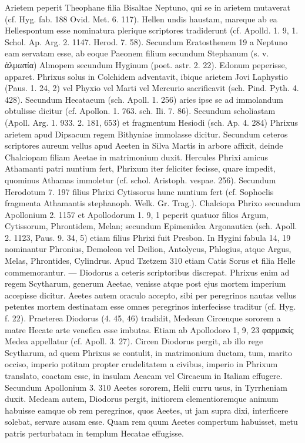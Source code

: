 \documentclass[landscape, a4paper, 11pt, oneside, polutonikogreek, german]{article}
\begin{document}
Arietem peperit Theophane filia Bisaltae Neptuno, qui se in arietem mutaverat (cf. Hyg. fab. 188 Ovid. Met. 6. 117). Hellen undis haustam, mareque ab ea Hellespontum esse nominatura plerique scriptores tradiderunt (cf. Apolld. 1. 9, 1. Schol. Ap. Arg. 2. 1147. Herod. 7. 58). Secundum Eratosthenem 19 a Neptuno eam servatam esse, ab eoque Paeonem filium secundum Stephanum (s. v. ἀλμωπία) Almopem secundum Hyginum (poet. astr. 2. 22). Edonum peperisse, apparet. Phrixus solus in Colchidem adventavit, ibique arietem Jovi Laphystio (Paus. 1. 24, 2) vel Phyxio vel Marti vel Mercurio sacrificavit (sch. Pind. Pyth. 4. 428). Secundum Hecataeum (sch. Apoll. 1. 256) aries ipse se ad immolandum obtulisse dicitur (cf. Apollon. 1. 763. sch. Ili. 7. 86). Secundum scholiastam (Apoll. Arg. 1. 933. 2. 181, 653) et fragmentum Hesiodi (sch. Ap. 4. 284) Phrixus arietem apud Dipsacum regem Bithyniae immolasse dicitur. Secundum ceteros scriptores aureum vellus apud Aeeten in Silva Martis in arbore affixit, deinde Chalciopam filiam Aeetae in matrimonium duxit. Hercules Phrixi amicus Athamanti patri nuntium fert, Phrixum iter feliciter fecisse, quare impedit, quominus Athamas immoletur (cf. schol. Aristoph. vespae. 256). Secundum Herodotum 7. 197 filius Phrixi Cytissorus hunc nuntium fert (cf. Sophoclis fragmenta Athamantis stephanoph. Welk. Gr. Trag.). Chalciopa Phrixo secundum Apollonium 2. 1157 et Apollodorum 1. 9, 1 peperit quatuor filios Argum, Cytissorum, Phrontidem, Melan; secundum Epimenidea Argonautica (sch. Apoll. 2. 1123, Paus. 9. 34, 5) etiam filius Phrixi fuit Presbon. In Hygini fabula 14, 19 nominantur Phronius, Demoleon vel Deilion, Antolycus, Phlogius, atque Argus, Melas, Phrontides, Cylindrus. Apud Tzetzem 310 etiam Catis Sorus et filia Helle commemorantur. --- Diodorus a ceteris scriptoribus discrepat. Phrixus enim ad regem Scytharum, generum Aeetae, venisse atque post ejus mortem imperium accepisse dicitur. Aeetes autem oraculo accepto, sibi per peregrinos nautas vellus petentes mortem destinatam esse omnes peregrinos interfecisse traditur (cf. Hyg. f. 22). Praeterea Diodorus (4. 45, 46) tradidit, Medeam Circenque sororem a matre Hecate arte venefica esse imbutas. Etiam ab Apollodoro 1, 9, 23 φαρμακίς Medea appellatur (cf. Apoll. 3. 27). Circen Diodorus pergit, ab illo rege Scytharum, ad quem Phrixus se contulit, in matrimonium ductam, tum, marito occiso, imperio potitam propter crudelitatem a civibus, imperio in Phrixum translato, coactam esse, in insulam Aeaeam vel Circaeum in Italiam effugere. Secundum Apollonium 3. 310 Aeetes sororem, Helii curru usus, in Tyrrheniam duxit. Medeam autem, Diodorus pergit, initiorem clementioremque animum habuisse eamque ob rem peregrinos, quos Aeetes, ut jam supra dixi, interficere solebat, servare ausam esse. Quam rem quum Aeetes compertum habuisset, metu patris perturbatam in templum Hecatae effugisse.
\end{document}
